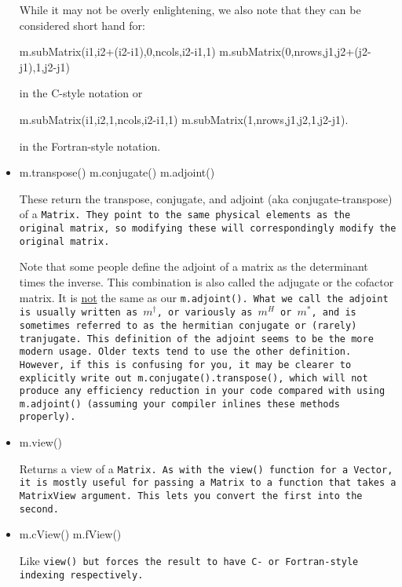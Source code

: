 \begin{itemize}
While it may not be overly enlightening, we also note that they can be considered short hand for:
\begin{tmvcode}
m.subMatrix(i1,i2+(i2-i1),0,ncols,i2-i1,1)
m.subMatrix(0,nrows,j1,j2+(j2-j1),1,j2-j1)
\end{tmvcode}
in the C-style notation or 
\begin{tmvcode}
m.subMatrix(i1,i2,1,ncols,i2-i1,1)
m.subMatrix(1,nrows,j1,j2,1,j2-j1).
\end{tmvcode}
in the Fortran-style notation.

\item
\begin{tmvcode}
m.transpose()
m.conjugate()
m.adjoint()
\end{tmvcode}
These return the transpose, conjugate, and adjoint (aka conjugate-transpose) 
of a \tt{Matrix}.  They point to the 
same physical elements as the original matrix, so modifying these will
correspondingly modify the original matrix.

Note that some people define the adjoint of a matrix as the determinant times
the inverse.  This combination is also called the adjugate or the cofactor matrix.
It is \underline{not} the same as our \tt{m.adjoint()}.  What we call the adjoint 
is usually written as $m^\dagger$, or variously as $m^H$ or $m^*$, 
and is sometimes referred to as the hermitian conjugate
or (rarely) tranjugate.  This definition of the adjoint seems to be the more modern
usage.  Older texts tend to use the other definition.  However, if this is confusing
for you, it may be clearer to explicitly write out \tt{m.conjugate().transpose()},
which will not produce any efficiency reduction in your code compared with using
\tt{m.adjoint()} (assuming your compiler inlines these methods properly).

\item
\begin{tmvcode}
m.view()
\end{tmvcode}
Returns a view of a \tt{Matrix}.  As with the \tt{view()} function for a \tt{Vector}, it is mostly
useful for passing a \tt{Matrix} to a function that takes a \tt{MatrixView} argument.  
This lets you convert the first into the second.

\item
\begin{tmvcode}
m.cView()
m.fView()
\end{tmvcode}
Like \tt{view()} but forces the result to have C- or Fortran-style indexing respectively.


\end{itemize}

